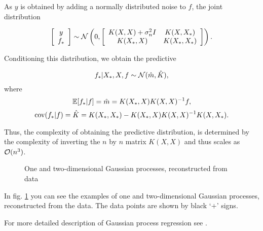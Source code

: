 As $y$ is obtained by adding a normally distributed noise to $f$, the joint distribution

$$
\left [ \begin{array}{c} y\\ f_* \end{array} \right ]
\sim
\mathcal{N} \left ( 0, \left [\begin{array}{cc} K(X, X) + \sigma_n^2 I & K(X, X_*)\\ K(X_*, X) & K(X_*, X_*) \end{array} \right] \right ).
$$

Conditioning this distribution, we obtain the predictive


$$f_* | X_*, X, f \sim \mathcal{N}( \hat m, \hat K ),$$
where 
$$\mathbb{E} [f_* | f ] = \hat m = K(X_*, X) K(X, X)^{-1} f,$$
$$\mbox{cov}(f_* | f ) = \hat K = K(X_*, X_*) - K(X_*, X)K(X, X)^{-1}K(X, X_*).$$

Thus, the complexity of obtaining the predictive distribution, is determined by the complexity of inverting the $n$ by $n$ matrix $K(X, X)$ and thus scales as $\mathcal{O}(n^3)$.

\begin{figure}[!h]
	\centering
	\subfloat{
		\scalebox{0.7}{
			
		}
	}
	\subfloat{
		\scalebox{0.7}{
    		
		}
	}
	\caption{One and two-dimensional Gaussian processes, reconstructed from data}
	\label{brute_reg_example}
\end{figure}


In fig. \ref{brute_reg_example} you can see the examples of one and two-dimensional Gaussian processes, reconstructed from the data. The data points are shown by black `$+$' signs. 

For more detailed description of Gaussian process regression see \cite{GPinML}.